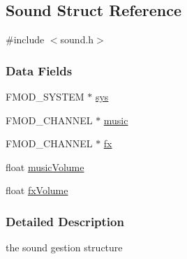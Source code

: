 \hypertarget{struct_sound}{\subsection{Sound Struct Reference}
\label{struct_sound}
}


{\ttfamily \#include $<$sound.\-h$>$}

\subsubsection*{Data Fields}
\begin{DoxyCompactItemize}
\item 
F\-M\-O\-D\-\_\-\-S\-Y\-S\-T\-E\-M $\ast$ \hyperlink{struct_sound_ae043bb23ee313709e1c605dd6c06d317}{sys}
\item 
F\-M\-O\-D\-\_\-\-C\-H\-A\-N\-N\-E\-L $\ast$ \hyperlink{struct_sound_acca26c408c6140c8cdc0d8f49d31ad4a}{music}
\item 
F\-M\-O\-D\-\_\-\-C\-H\-A\-N\-N\-E\-L $\ast$ \hyperlink{struct_sound_a259d72174e26b5bb58146484cd54c1c8}{fx}
\item 
float \hyperlink{struct_sound_a6f06b572245c72c79f052b7efb89dc3b}{music\-Volume}
\item 
float \hyperlink{struct_sound_aedb4246a8bbae1c53f2f29572674b054}{fx\-Volume}
\end{DoxyCompactItemize}


\subsubsection{Detailed Description}
the sound gestion structure 

